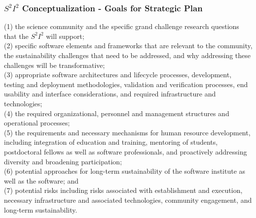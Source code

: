 \begin{frame}
\frametitle{$ S^2 I^2 $ Conceptualization - Goals for Strategic Plan}
\fontsize{11pt}{7.2}\selectfont


(1) the science community and the specific grand challenge research questions that the $ S^2 I^2 $ will support; \\
(2) specific software elements and frameworks that are relevant to the community, the sustainability challenges that need to be addressed, and why addressing these challenges will be transformative; \\
(3) appropriate software architectures and lifecycle processes, development, testing and deployment methodologies, validation and verification processes, end usability and interface considerations, and required infrastructure and technologies; \\
(4) the required organizational, personnel and management structures and operational processes; \\
(5) the requirements and necessary mechanisms for human resource development, including integration of education and training, mentoring of students, postdoctoral fellows as well as software professionals, and proactively addressing diversity and broadening participation; \\
(6) potential approaches for long-term sustainability of the software institute as well as the software; and \\
(7) potential risks including risks associated with establishment and execution, necessary infrastructure and associated technologies, community engagement, and long-term sustainability. \\

\end{frame}



